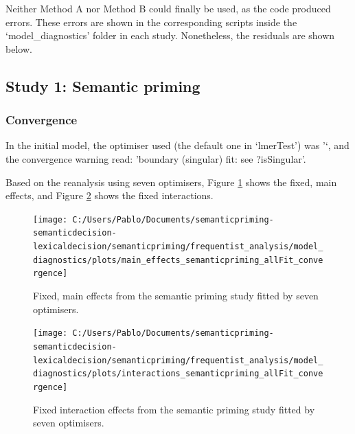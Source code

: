 \documentclass[
  12pt,
  man,floatsintext]{apa7}
\begin{document}
Neither Method A nor Method B could finally be used, as the code produced errors. These errors are shown in the corresponding scripts inside the `model\_diagnostics' folder in each study. Nonetheless, the residuals are shown below.

\hypertarget{study-1-semantic-priming-2}{%
\subsection{Study 1: Semantic priming}\label{study-1-semantic-priming-2}}

\hypertarget{convergence-2}{%
\subsubsection{Convergence}\label{convergence-2}}

In the initial model, the optimiser used (the default one in `lmerTest') was '`, and the convergence warning read: 'boundary (singular) fit: see ?isSingular'.

Based on the reanalysis using seven optimisers, Figure \ref{fig:main-effects-semanticpriming-allFit-convergence} shows the fixed, main effects, and Figure \ref{fig:interactions-semanticpriming-allFit-convergence} shows the fixed interactions.

\begin{figure}

{\centering \texttt{[image: C:/Users/Pablo/Documents/semanticpriming-semanticdecision-lexicaldecision/semanticpriming/frequentist\_analysis/model\_diagnostics/plots/main\_effects\_semanticpriming\_allFit\_convergence]} 

}

\caption{Fixed, main effects from the semantic priming study fitted by seven optimisers.}\label{fig:main-effects-semanticpriming-allFit-convergence}
\end{figure}

\begin{figure}

{\centering \texttt{[image: C:/Users/Pablo/Documents/semanticpriming-semanticdecision-lexicaldecision/semanticpriming/frequentist\_analysis/model\_diagnostics/plots/interactions\_semanticpriming\_allFit\_convergence]} 

}

\caption{Fixed interaction effects from the semantic priming study fitted by seven optimisers.}\label{fig:interactions-semanticpriming-allFit-convergence}
\end{figure}
\end{document}
